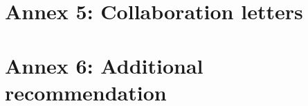 \newpage
\chapter{Annex 5: Collaboration letters}
\begin{figure}[!ht]
\centering

\label{fig:loi_ncar}
\end{figure}

\newpage
\begin{figure}[!ht]
\centering

\label{fig:loi_uio}
\end{figure}

\newpage
\chapter{Annex 6: Additional recommendation}
\begin{figure}[!ht]
\centering

\end{figure}
